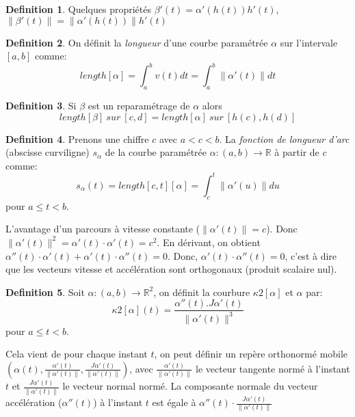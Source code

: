\documentclass[]{book}
\theoremstyle{definition}
\newtheorem{defn}{Definition}
\newcommand{\bb}[1]{\mathbb{#1}}
\newcommand{\R}{\bb{R}}
\begin{document}
 
\begin{defn}
Quelques propri\'et\'es $\beta'(t) = \alpha'(h(t))h'(t)$, $\lVert \beta'(t)\rVert = \lVert\alpha'(h(t))\rVert h'(t)$
\end{defn}
 

\begin{defn}
On d\'efinit la \emph{longueur} d'une courbe param\'etr\'ee $\alpha$ sur l'intervale $[a,b]$ comme:
$$length[\alpha] = \int_a^b v(t) dt = \int_a^b \lVert \alpha'(t)\rVert dt$$
\end{defn}

\begin{defn}
Si $\beta$ est un reparam\'etrage de $\alpha$ alors
$$length[\beta] \ sur\ [c,d] = length[\alpha]  \ sur\ [h(c),h(d)]$$ 
\end{defn}
 

\begin{defn}
Prenons une chiffre $c$ avec $a < c < b$. La \emph{fonction de longueur d'arc} (abscisse curviligne) $s_{\alpha}$ de la courbe param\'etr\'ee $\alpha:(a,b) \to \R$ \`a partir de $c$ comme:
$$
s_{\alpha}(t) = length[c,t][\alpha] = \int_c^t \lVert \alpha'(u) \rVert du
$$ 
pour $a \le t < b$.
\end{defn}

L'avantage d'un parcours \`a vitesse constante ($\lVert \alpha'(t) \rVert = c$). Donc $\lVert \alpha'(t) \rVert^2 = \alpha'(t) \cdot \alpha'(t) = c^2$. En d\'erivant, on obtient $\alpha''(t) \cdot \alpha'(t) + \alpha'(t) \cdot \alpha''(t) = 0$. Donc,  $\alpha'(t) \cdot \alpha''(t) = 0$, c'est \`a dire que les vecteurs vitesse et acc\'el\'eration sont orthogonaux (produit scalaire nul).
 
\begin{defn}
Soit $\alpha: (a,b) \to \R^2$, on d\'efinit la courbure $\kappa2[\alpha]$ et $\alpha$ par:
$$
\kappa2[\alpha](t) = \frac{\alpha''(t).J\alpha'(t)}{\lVert \alpha'(t) \rVert^3}
$$ 
pour $a \le t < b$.
\end{defn}

Cela vient de pour chaque instant $t$, on peut d\'efinir un rep\`ere orthonorm\'e mobile $(\alpha(t), \frac{\alpha'(t)}{\lVert\alpha'(t)\rVert}, \frac{J\alpha'(t)}{\lVert \alpha'(t)\rVert})$, avec $\frac{\alpha'(t)}{\lVert \alpha'(t)\rVert}$ le vecteur tangente norm\'e \`a l'instant $t$ et $\frac{J\alpha'(t)}{\lVert \alpha'(t)\rVert}$ le vecteur normal norm\'e. La composante normale du vecteur acc\'el\'eration ($\alpha''(t)$) \`a l'instant $t$ est \'egale \`a $\alpha''(t) \cdot \frac{J\alpha'(t)}{\lVert \alpha'(t)\rVert}$ 
\end{document}
